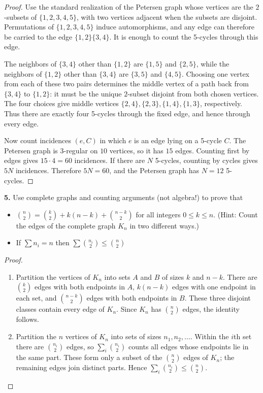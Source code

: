 \documentclass[12pt]{amsart}
\theoremstyle{conjecture}
\theoremstyle{definition}
\theoremstyle{question}
\theoremstyle{theorem}
\begin{document}
    \begin{proof}
        Use the standard realization of the Petersen graph whose vertices are the $2$-subsets of
        $\{1,2,3,4,5\}$, with two vertices adjacent when the subsets are disjoint. Permutations of
        $\{1,2,3,4,5\}$ induce automorphisms, and any edge can therefore be carried to the edge
        $\{1,2\}\{3,4\}$. It is enough to count the 5-cycles through this edge.

        The neighbors of $\{3,4\}$ other than $\{1,2\}$ are $\{1,5\}$ and $\{2,5\}$, while the neighbors
        of $\{1,2\}$ other than $\{3,4\}$ are $\{3,5\}$ and $\{4,5\}$. Choosing one vertex from each of
        these two pairs determines the middle vertex of a path back from $\{3,4\}$ to $\{1,2\}$: it must
        be the unique $2$-subset disjoint from both chosen vertices. The four choices give middle vertices
        $\{2,4\},\{2,3\},\{1,4\},\{1,3\}$, respectively. Thus there are exactly four 5-cycles through the
        fixed edge, and hence through every edge.

        Now count incidences $(e,C)$ in which $e$ is an edge lying on a 5-cycle $C$. The Petersen graph is
        $3$-regular on $10$ vertices, so it has $15$ edges. Counting first by edges gives $15\cdot4=60$
        incidences. If there are $N$ 5-cycles, counting by cycles gives $5N$ incidences. Therefore
        $5N=60$, and the Petersen graph has $N=12$ 5-cycles.
    \end{proof}

    \noindent\textbf{5.} Use complete graphs and counting arguments (not algebra!) to prove that
    \begin{itemize}
        \item[(a)] $\binom{n}{2} = \binom{k}{2} + k(n - k) + \binom{n-k}{2}$ for all integers $0\le k\le n$.
        (Hint: Count the edges of the complete graph $K_n$ in two different ways.)
        \item[(b)] If $\sum n_i = n$ then $\sum\binom{n_i}{2} \le \binom{n}{2}$
    \end{itemize}

    \begin{proof}
        \begin{enumerate}[label=(\alph*)]
            \item Partition the vertices of $K_n$ into sets $A$ and $B$ of sizes $k$ and $n-k$.
            There are $\binom{k}{2}$ edges with both endpoints in $A$, $k(n-k)$ edges with one endpoint
            in each set, and $\binom{n-k}{2}$ edges with both endpoints in $B$. These three disjoint classes
            contain every edge of $K_n$. Since $K_n$ has $\binom{n}{2}$ edges, the identity follows.

            \item Partition the $n$ vertices of $K_n$ into sets of sizes $n_1,n_2,\ldots$. Within the
            $i$th set there are $\binom{n_i}{2}$ edges, so $\sum_i\binom{n_i}{2}$ counts all edges whose
            endpoints lie in the same part. These form only a subset of the $\binom{n}{2}$ edges of $K_n$;
            the remaining edges join distinct parts. Hence
            $\sum_i\binom{n_i}{2}\leq\binom{n}{2}$.
        \end{enumerate}
    \end{proof}
\end{document}
